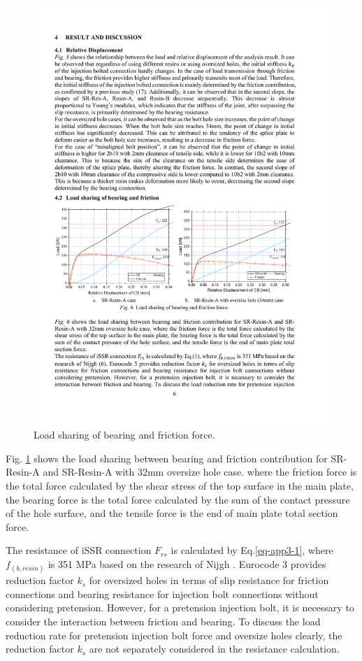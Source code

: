 \begin{figure}[htbp]
    \centering
    \includegraphics[width=\textwidth]{imgs/app3/LDS-RIBJ.pdf}
    \caption{Load sharing of bearing and friction force.}
    \label{fig-LDS-RIBJ}
\end{figure}

Fig. \ref{fig-LDS-RIBJ} shows the load sharing between bearing and friction contribution for SR-Resin-A and SR-Resin-A with 32mm oversize hole case. where the friction force is the total force calculated by the shear stress of the top surface in the main plate, the bearing force is the total force calculated by the sum of the contact pressure of the hole surface, and the tensile force is the end of main plate total section force.

The resistance of iSSR connection $F_{rs}$ is calculated by Eq.\ref{eq-app3-1}, where $f_{(b,resin)}$ is 351 MPa based on the research of Nijgh \cite{nijgh_new_2017}. Eurocode 3 provides reduction factor $k_s$ for oversized holes in terms of slip resistance for friction connections and bearing resistance for injection bolt connections without considering pretension. However, for a pretension injection bolt, it is necessary to consider the interaction between friction and bearing. To discuss the load reduction rate for pretension injection bolt force and oversize holes clearly, the reduction factor $k_s$ are not separately considered in the resistance calculation.

